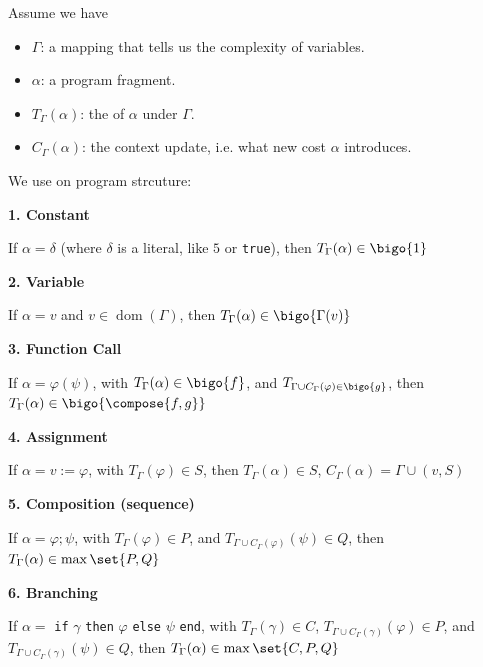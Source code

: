 
Assume we have 
\begin{itemize}
    \item $\Gamma$: a mapping that tells us the complexity of variables.
    \item $\alpha$: a program fragment.
    \item $T_{\Gamma} (\alpha)$: the  of $\alpha$ under $\Gamma$.
    \item $C_{\Gamma} (\alpha)$: the context update, i.e. what new cost $\alpha$ introduces.
\end{itemize}
We use  on program strcuture:

\textbf{1. Constant}

If $\alpha = \delta$ (where $\delta$ is a literal, like $5$ or \texttt{true}), then $T_{\Gamma} (\alpha) \in \bigo{1}$

\textbf{2. Variable}

If $\alpha = v$ and $v \in \operatorname{dom}(\Gamma)$, then $T_{\Gamma} (\alpha) \in \bigo{\Gamma (v)}$

\textbf{3. Function Call}

If $\alpha = \varphi (\psi)$, with $T_{\Gamma} (\alpha) \in \bigo{f}$, and $T_{\Gamma \cup C_{\Gamma} (\varphi) \in \bigo{g}}$, then $T_{\Gamma} (\alpha) \in \bigo{\compose{f,g}}$

\textbf{4. Assignment}

If $\alpha = v := \varphi$, with $T_{\Gamma} (\varphi) \in S$, then $T_{\Gamma} (\alpha) \in S$, $C_{\Gamma} (\alpha) = \Gamma \cup (v, S)$

\textbf{5. Composition (sequence)}

If $\alpha = \varphi;\psi$, with $T_{\Gamma} (\varphi) \in P$, and $T_{\Gamma \cup C_{\Gamma}(\varphi)}(\psi) \in Q$, then $T_{\Gamma} (\alpha) \in \operatorname{max}\set{P,Q}$

\textbf{6. Branching}

If $\alpha = $ \texttt{if} $\gamma$ \texttt{then} $\varphi$ \texttt{else} $\psi$ \texttt{end}, with $T_{\Gamma} (\gamma) \in C$, $T_{\Gamma \cup C_{\Gamma}(\gamma)}(\varphi) \in P$, and $T_{\Gamma \cup C_{\Gamma}(\gamma)}(\psi) \in Q$, then $T_{\Gamma} (\alpha) \in \operatorname{max}\set{C,P,Q}$

